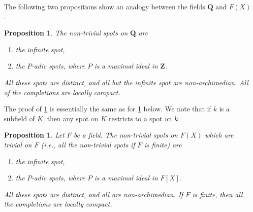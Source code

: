 \documentclass[10pt,leqno]{article}
\newtheorem{prop}[theo]{Proposition}
\theoremstyle{definition}
\def\ZZ{\mathbf{Z}}
\def\QQ{\mathbf{Q}}
\begin{document}
The following two propositions show an analogy between the fields $\QQ$ and $F(X)$.


\begin{prop}
\label{4.1.8}
The non-trivial spots on $\QQ$ are
\begin{enumerate}
\item
the infinite spot,

\item
the $P$-adic spots, where $P$ is a maximal ideal in $\ZZ$.
\end{enumerate}
All these spots are distinct, and all but the infinite spot are non-archimedian.
All of the completions are locally compact.
\end{prop}


The proof of \ref{4.1.8} is essentially the same as for \ref{4.1.9} below.
We note that if $k$ is a subfield of $K$, then any spot on $K$ restricts to a spot on $k$.


\begin{prop}
\label{4.1.9}
Let $F$ be a field.
The non-trivial spots on $F(X)$ which are trivial on $F$ (i.e., all the non-trivial spots if $F$ is finite) are
\begin{enumerate}
\item
the infinite spot,

\item
the $P$-adic spots, where $P$ is a maximal ideal in $F[X]$.
\end{enumerate}
All these spots are distinct, and all are non-archimedian.
If $F$ is finite, then all the completions are locally compact.
\end{prop}
\end{document}
